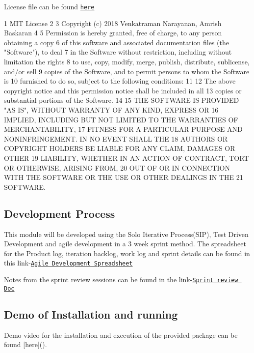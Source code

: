 License file can be found \href{https://github.com/vijay4313/intelli_bot/blob/master/LICENSE}{\tt here} 
\begin{DoxyCode}
1 MIT License
2 
3 Copyright (c) 2018 Venkatraman Narayanan, Amrish Baskaran
4 
5 Permission is hereby granted, free of charge, to any person obtaining a copy
6 of this software and associated documentation files (the "Software"), to deal
7 in the Software without restriction, including without limitation the rights
8 to use, copy, modify, merge, publish, distribute, sublicense, and/or sell
9 copies of the Software, and to permit persons to whom the Software is
10 furnished to do so, subject to the following conditions:
11 
12 The above copyright notice and this permission notice shall be included in all
13 copies or substantial portions of the Software.
14 
15 THE SOFTWARE IS PROVIDED "AS IS", WITHOUT WARRANTY OF ANY KIND, EXPRESS OR
16 IMPLIED, INCLUDING BUT NOT LIMITED TO THE WARRANTIES OF MERCHANTABILITY,
17 FITNESS FOR A PARTICULAR PURPOSE AND NONINFRINGEMENT. IN NO EVENT SHALL THE
18 AUTHORS OR COPYRIGHT HOLDERS BE LIABLE FOR ANY CLAIM, DAMAGES OR OTHER
19 LIABILITY, WHETHER IN AN ACTION OF CONTRACT, TORT OR OTHERWISE, ARISING FROM,
20 OUT OF OR IN CONNECTION WITH THE SOFTWARE OR THE USE OR OTHER DEALINGS IN THE
21 SOFTWARE.
\end{DoxyCode}


\subsection*{Development Process}

This module will be developed using the Solo Iterative Process(\+S\+I\+P), Test Driven Development and agile development in a 3 week sprint method. The spreadsheet for the Product log, iteration backlog, work log and sprint details can be found in this link-\/\href{https://docs.google.com/spreadsheets/d/1cRZ1Yc6He_yjTwrT3RzN5OtVLop9_kAH2wNIdsGixpU/edit#gid=383324177}{\tt Agile Development Spreadsheet}

Notes from the sprint review sessions can be found in the link-\/\href{https://docs.google.com/document/d/1bJjVpGoex2Z11x2BASVN002mspXWGj8SX9v-RlrVU2g/edit}{\tt Sprint review Doc}

\subsection*{Demo of Installation and running}

Demo video for the installation and execution of the provided package can be found \mbox{[}here\mbox{]}().

